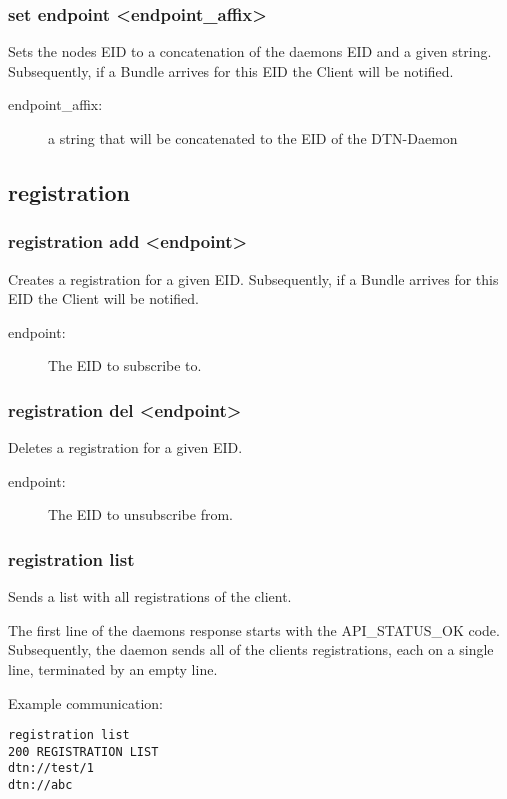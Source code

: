 \documentclass[12pt, a4paper]{scrartcl}
\begin{document}
\subsubsection*{set endpoint <endpoint\_affix>}
Sets the nodes EID to a concatenation of the daemons EID and a given string.
Subsequently, if a Bundle arrives for this EID the Client will be notified.
\begin{description}
\item[endpoint\_affix:] a string that will be concatenated to the EID of the DTN-Daemon
\end{description}
\subsection{registration}
\subsubsection*{registration add <endpoint>}
Creates a registration for a given EID.
Subsequently, if a Bundle arrives for this EID the Client will be notified.
\begin{description}
\item[endpoint:] The EID to subscribe to.
\end{description}
\subsubsection*{registration del <endpoint>}
Deletes a registration for a given EID.
\begin{description}
\item[endpoint:] The EID to unsubscribe from.
\end{description}
\subsubsection*{registration list}
Sends a list with all registrations of the client.

The first line of the daemons response starts with the API\_STATUS\_OK code.
Subsequently, the daemon sends all of the clients registrations, each on a single line, terminated by an empty line.

Example communication:\\
\makebox[\textwidth]{\hrulefill}
\begin{verbatim}
registration list
200 REGISTRATION LIST
dtn://test/1
dtn://abc

\end{verbatim}
\makebox[\textwidth]{\hrulefill}
\end{document}
